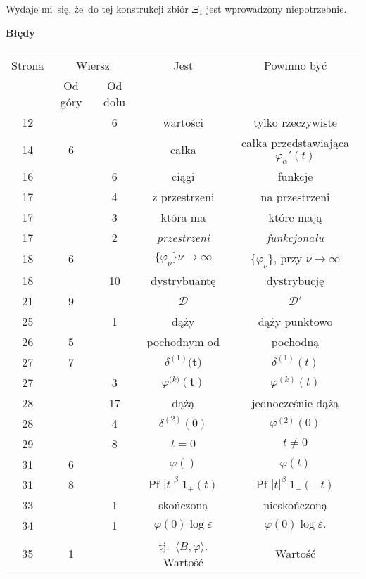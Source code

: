 \documentclass[a4paper,11pt]{article}
\newcommand{\mr}{\mathrm}
\newcommand{\mc}{\mathcal}
\newcommand{\bsym}{\boldsymbol}
\newcommand{\ra}{\rightarrow}
\newcommand{\al}{\alpha}
\newcommand{\be}{\beta}
\newcommand{\del}{\delta}
\newcommand{\veps}{\varepsilon}
\newcommand{\vp}{\varphi}
\newcommand{\D}{\mc{D}}
\newcommand{\lket}{\langle}
\newcommand{\rket}{\rangle}
\newcommand{\tb}{\textbf}
\newcommand{\Center}[1]{\begin{center} #1 \end{center}}
\newcommand{\CenterTB}[1]{\Center{\tb{#1}}}
\newcommand{\Pf}{\mr{Pf}\,}
\begin{document}
Wydaje mi~się, że~do tej konstrukcji zbiór $\Xi_{ 1 }$ jest
wprowadzony niepotrzebnie.

\newpage
\CenterTB{Błędy}
\begin{center}
  \begin{tabular}{|c|c|c|c|c|}
    \hline
    & \multicolumn{2}{c|}{} & & \\
    Strona & \multicolumn{2}{c|}{Wiersz}& Jest & Powinno być \\ \cline{2-3}
    & Od góry & Od dołu &  &  \\ \hline
    12 & & 6 & wartości & tylko rzeczywiste \\
    14 & 6 & & całka & całka przedstawiająca $\vp_{ \al }'( t )$ \\
    16 & & 6 & ciągi & funkcje \\
    17 & & 4 & z przestrzeni & na przestrzeni \\
    17 & & 3 & która ma & które mają \\
    17 & & 2 & \emph{przestrzeni} & \emph{funkcjonału} \\
    18 & 6 & & $\{ \vp_{ \nu } \}\nu \ra \infty$ & $\{ \vp_{ \nu } \}$,
                                                   przy $\nu \ra \infty$ \\
    18 & & 10 & dystrybuantę & dystrybucję \\
    21 & 9 & & $\D$ & $\D'$ \\
    25 & & 1 & dąży & dąży punktowo \\
    26 & 5 & & pochodnym od & pochodną \\
    27 & 7 & & $\del^{ ( 1 ) }\bsym{ ( t } )$ & $\del^{ ( 1 ) }( t )$ \\
    27 & & 3 & $\vp^{ ( k \bsym{ ) } }\bsym{ ( t ) } $
           & $\vp^{ ( k ) }( t )$ \\
    28 & & 17 & dążą & jednocześnie dążą \\
    28 & & 4 & $\del^{ ( 2 ) }( 0 )$ & $\vp^{ ( 2 ) }( 0 )$ \\
    29 & & 8 & $t = 0$ & $t \neq 0$ \\
    31 & 6 & & $\vp( )$ & $\vp( t )$ \\
    31 & 8 & & $\Pf \, | t |^{ \be } \; 1_{ + }( t )$
           & $\Pf \, | t |^{ \be } \; 1_{ + }( -t )$ \\
    33 & & 1 & skończoną & nieskończoną \\
    34 & & 1 & $\vp( 0 ) \log\veps$ & $\vp( 0 ) \log\veps.$ \\
    35 & 1 & & tj.~$\lket B, \vp \rket$. Wartość & Wartość \\

\end{tabular}
\end{center}
\end{document}

